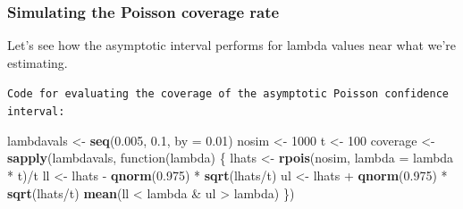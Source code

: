 \documentclass[]{article}
\newenvironment{Shaded}{\begin{snugshade}}{\end{snugshade}}
\newcommand{\KeywordTok}[1]{\textcolor[rgb]{0.13,0.29,0.53}{\textbf{{#1}}}}
\newcommand{\DataTypeTok}[1]{\textcolor[rgb]{0.13,0.29,0.53}{{#1}}}
\newcommand{\DecValTok}[1]{\textcolor[rgb]{0.00,0.00,0.81}{{#1}}}
\newcommand{\FloatTok}[1]{\textcolor[rgb]{0.00,0.00,0.81}{{#1}}}
\newcommand{\StringTok}[1]{\textcolor[rgb]{0.31,0.60,0.02}{{#1}}}
\newcommand{\NormalTok}[1]{{#1}}
\begin{document}
\subsubsection{Simulating the Poisson coverage
rate}\label{simulating-the-poisson-coverage-rate}

Let's see how the asymptotic interval performs for lambda values near
what we're estimating.

\vspace{1pc}

\verb;Code for evaluating the coverage of the asymptotic Poisson confidence interval:;

\begin{Shaded}
\begin{Highlighting}[]
\NormalTok{lambdavals <-}\StringTok{ }\KeywordTok{seq}\NormalTok{(}\FloatTok{0.005}\NormalTok{, }\FloatTok{0.1}\NormalTok{, }\DataTypeTok{by =} \FloatTok{0.01}\NormalTok{)}
\NormalTok{nosim <-}\StringTok{ }\DecValTok{1000}
\NormalTok{t <-}\StringTok{ }\DecValTok{100}
\NormalTok{coverage <-}\StringTok{ }\KeywordTok{sapply}\NormalTok{(lambdavals, function(lambda) \{}
    \NormalTok{lhats <-}\StringTok{ }\KeywordTok{rpois}\NormalTok{(nosim, }\DataTypeTok{lambda =} \NormalTok{lambda *}\StringTok{ }\NormalTok{t)/t}
    \NormalTok{ll <-}\StringTok{ }\NormalTok{lhats -}\StringTok{ }\KeywordTok{qnorm}\NormalTok{(}\FloatTok{0.975}\NormalTok{) *}\StringTok{ }\KeywordTok{sqrt}\NormalTok{(lhats/t)}
    \NormalTok{ul <-}\StringTok{ }\NormalTok{lhats +}\StringTok{ }\KeywordTok{qnorm}\NormalTok{(}\FloatTok{0.975}\NormalTok{) *}\StringTok{ }\KeywordTok{sqrt}\NormalTok{(lhats/t)}
    \KeywordTok{mean}\NormalTok{(ll <}\StringTok{ }\NormalTok{lambda &}\StringTok{ }\NormalTok{ul >}\StringTok{ }\NormalTok{lambda)}
\NormalTok{\})}
\end{Highlighting}
\end{Shaded}
\end{document}
